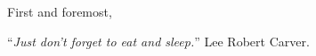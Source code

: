\documentclass[
11pt, %
english, %
singlespacing, %
headsepline, %
]{MastersDoctoralThesis} %
\begin{document}

\begin{acknowledgements}
\addchaptertocentry{\acknowledgementname} %
\vspace{0.8cm}
First and foremost, 
\end{acknowledgements}




\newpage
\vspace*{0.4\textheight}
\begin{center}
	\noindent\enquote{\itshape Just don't forget to eat and sleep.}\bigbreak
	Lee Robert Carver.
\end{center}



\tableofcontents %

\listoffigures %

\listoftables %


\end{document}
